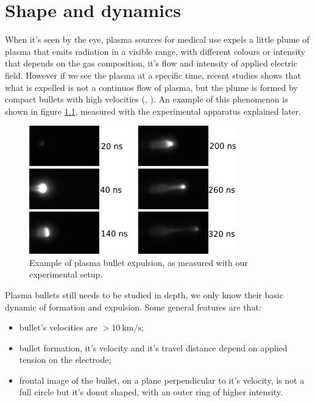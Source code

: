 \chapter{Shape and dynamics}
\label{ch:forma}
When it's seen by the eye, plasma sources for medical use expels a little plume of plasma that emits radiation in a visible range, with different colours or intensity that depends on the gas composition, it's flow and intensity of applied electric field. 
However if we see the plasma at a specific time, recent studies shows that what is expelled is not a continuos flow of plasma, but the plume is formed by compact bullets with high velocities (\cite{Mericam_Bourdet_2009}, \cite{doi:10.1002/ppap.200900078}).
An example of this phenomenon is shown in figure \ref{fig:pl_bullet}, measured with the experimental apparatus explained later.

\begin{figure}
 \centering
 \includegraphics[width=0.8\textwidth]{Images/Shape/frames.png}
 \caption{Example of plasma bullet expulsion, as measured with our experimental setup.}
 \label{fig:pl_bullet}
\end{figure}

Plasma bullets still needs to be studied in depth, we only know their basic dynamic of formation and expulsion. Some general features are that:
\begin{itemize}
 \item bullet's velocities are $> \SI{10}{\kilo\meter/\second}$;
 \item bullet formation, it's velocity and it's travel distance depend on applied tension on the electrode;
 \item frontal image of the bullet, on a plane perpendicular to it's velocity, is not a full circle but it's donut shaped, with an outer ring of higher intensity.
\end{itemize}

